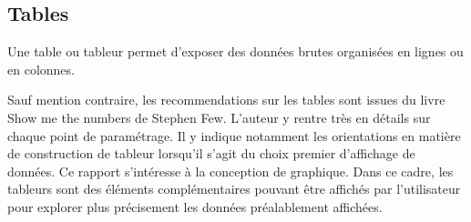 \documentclass[11pt]{article}
\begin{document}
\subsection{Tables}
\label{sec:org8a2488d}
Une table ou tableur permet d'exposer des données brutes organisées en lignes ou en colonnes.

Sauf mention contraire, les recommendations sur les tables sont issues du livre \og Show me the numbers\fg{} de Stephen Few.\autocite{stephenfew8TableDesign2012} L'auteur y rentre très en détails sur chaque point de paramétrage. Il y indique notamment les orientations en matière de construction de tableur lorsqu'il s'agit du choix premier d'affichage de données. Ce rapport s'intéresse à la conception de graphique. Dans ce cadre, les tableurs sont des éléments complémentaires pouvant être affichés par l'utilisateur pour explorer plus précisement les données préalablement affichées.
\end{document}
